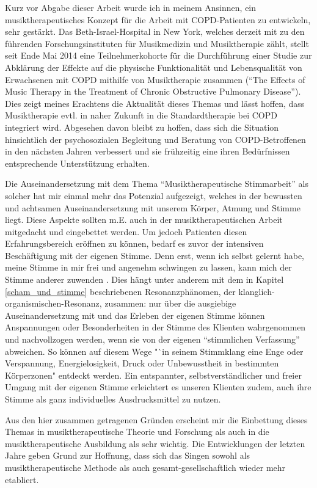 Kurz vor Abgabe dieser Arbeit wurde ich in meinem Ansinnen, ein musiktherapeutisches Konzept für die Arbeit mit COPD-Patienten zu entwickeln, sehr gestärkt. Das Beth-Israel-Hospital in New York, welches derzeit mit zu den führenden Forschungsinstituten für Musikmedizin und Musiktherapie zählt, stellt seit Ende Mai 2014 eine Teilnehmerkohorte für die Durchführung einer Studie zur Abklärung der Effekte auf die physische Funktionalität und Lebensqualität von Erwachsenen mit COPD mithilfe von Musiktherapie zusammen ("`The Effects of Music Therapy in the Treatment of Chronic Obstructive Pulmonary Disease"'). Dies zeigt meines Erachtens die Aktualität dieses Themas und lässt hoffen, dass Musiktherapie evtl. in naher Zukunft in die Standardtherapie bei COPD integriert wird. Abgesehen davon bleibt zu hoffen, dass sich die Situation hinsichtlich der psychosozialen Begleitung und Beratung von COPD-Betroffenen in den nächsten Jahren verbessert und sie frühzeitig eine ihren Bedürfnissen entsprechende Unterstützung erhalten.

Die Auseinandersetzung mit dem Thema "`Musiktherapeutische Stimmarbeit"' als solcher hat mir einmal mehr das Potenzial aufgezeigt, welches in der bewussten und achtsamen Auseinandersetzung mit unserem Körper, Atmung und Stimme liegt.
Diese Aspekte sollten m.E. auch in der musiktherapeutischen Arbeit mitgedacht und eingebettet werden. Um jedoch Patienten diesen Erfahrungsbereich eröffnen zu können, bedarf es zuvor der intensiven Beschäftigung mit der eigenen Stimme. Denn erst, wenn ich selbst gelernt habe, meine Stimme in mir frei und angenehm schwingen zu lassen, kann mich der Stimme anderer zuwenden \autocite[vgl.][15]{mcmurtry2012}. 
Dies hängt unter anderem mit dem in Kapitel \ref{scham_und_stimme} beschriebenen Resonanzphänomen, der klanglich-organismischen-Resonanz, zusammen: nur über die ausgiebige Auseinandersetzung mit und das Erleben der eigenen Stimme können Anspannungen oder Besonderheiten in der Stimme des Klienten wahrgenommen und nachvollzogen werden, wenn sie von der eigenen "`stimmlichen Verfassung"' abweichen. 
So können auf diesem Wege "`in seinem Stimmklang eine Enge oder Verspannung, Energielosigkeit, Druck oder Unbewusstheit in bestimmten Körperzonen" \autocite[16]{mcmurtry2012} entdeckt werden. 
Ein entspannter, selbstverständlicher und freier Umgang mit der eigenen Stimme erleichtert es unseren Klienten zudem, auch ihre Stimme als ganz individuelles Ausdrucksmittel zu nutzen.

Aus den hier zusammen getragenen Gründen erscheint mir die Einbettung dieses Themas in musiktherapeutische Theorie und Forschung als auch in die musiktherapeutische Ausbildung als sehr wichtig. Die Entwicklungen der letzten Jahre geben Grund zur Hoffnung, dass sich das Singen sowohl als musiktherapeutische Methode als auch gesamt-gesellschaftlich wieder mehr etabliert.


\newpage\thispagestyle{empty}
